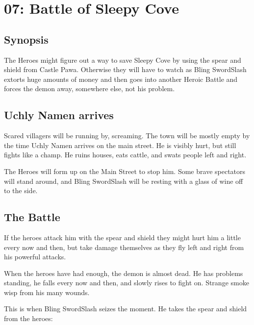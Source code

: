 \documentclass[11pt, twoside, titlepage, a4paper]{report}
\renewcommand{\chaptermark}[1]{\markboth{#1}{}}
\begin{document}


\clearpage
{}
\section*{07: Battle of Sleepy Cove}
\chaptermark{battle}


\subsection*{Synopsis}
The Heroes might figure out a way to save Sleepy Cove by using the spear and shield from Castle Pawa. Otherwise they will have to watch as Bling SwordSlash extorts huge amounts of money and then goes into another Heroic Battle and forces the demon away, somewhere else, not his problem.


\subsection*{Uchly Namen arrives}
Scared villagers will be running by, screaming. The town will be mostly empty by the time Uchly Namen arrives on the main street. He is visibly hurt, but still fights like a champ. He ruins houses, eats cattle, and swats people left and right.

The Heroes will form up on the Main Street to stop him. Some brave spectators will stand around, and Bling SwordSlash will be resting with a glass of wine off to the side.


\subsection*{The Battle}
If the heroes attack him with the spear and shield they might hurt him a little every now and then, but take damage themselves as they fly left and right from his powerful attacks.

When the heroes have had enough, the demon is almost dead. He has problems standing, he falls every now and then, and slowly rises to fight on. Strange smoke wisp from his many wounds.

This is when Bling SwordSlash seizes the moment. He takes the spear and shield from the heroes:
\end{document}
